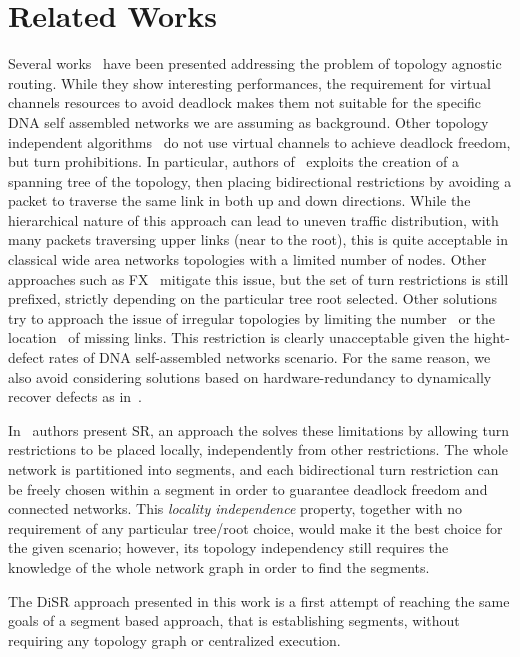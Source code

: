 \section{Related Works}
\label{sec:related_works}
Several works~\cite{sancho2002, skeie2002, skeie2004, koibuchi2003} have been presented addressing the problem of topology
agnostic routing. While they show interesting
performances, the requirement for virtual channels resources 
to avoid deadlock makes them not suitable for the specific DNA self
assembled networks we are assuming as background.
Other topology independent algorithms~\cite{schroeder1991, koibuchi2001, cherkasova1996} do not use virtual channels to
achieve deadlock freedom, but turn prohibitions. 
In particular, authors of~\cite{Patwardhan05evaluatingthe} exploits the creation of a spanning tree of the
topology, then placing bidirectional restrictions by avoiding a packet
to traverse the same link in both up and down directions.
While the hierarchical nature of this approach can lead to uneven traffic
distribution, with many packets traversing upper links (near to the
root), this is quite acceptable in classical wide area networks
topologies with a limited number of nodes. Other approaches such as
FX~\cite{sancho2000} mitigate this
issue, but the set of turn restrictions is still prefixed,
strictly depending on the particular tree root selected. 
Other solutions try to approach the issue of irregular
topologies by limiting the number~\cite{dally1994, duato1997, gomez2004, koibuchi2008} or the
location~\cite{zhang2008, sui2000, flich2008, liu2011} of missing links. This
restriction is clearly unacceptable given the hight-defect rates of
DNA self-assembled networks scenario. For the same reason, we also
avoid considering solutions based on hardware-redundancy to
dynamically recover defects as in~\cite{constantinides2006, kohler2010, kim2006, park2006}. 

In~\cite{mejia_ipdps06} authors present SR, an approach the solves these
limitations by allowing turn restrictions to be placed locally,
independently from other restrictions. The whole network is
partitioned into segments, and each bidirectional turn
restriction can be freely chosen within a segment in order to guarantee
deadlock freedom and connected networks. This \emph{locality
independence} property, together with no requirement of any particular tree/root
choice, would make it the best choice for the given scenario;
however, its topology independency still requires the knowledge of the
whole network graph in order to find the segments. 

The DiSR approach presented in this work is a first attempt of
reaching the same goals of a segment based approach, that is
establishing segments, without requiring any topology graph or
centralized execution. 



